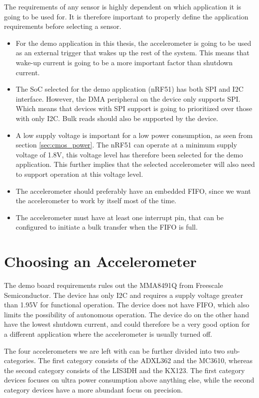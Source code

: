 The requirements of any sensor is highly dependent on which application it is going to be used for. It is therefore important to properly define the application requirements before selecting a sensor.

\begin{itemize}
\item For the demo application in this thesis, the accelerometer is going to be used as an external trigger that wakes up the rest of the system. This means that wake-up current is going to be a more important factor than shutdown current.
\item The SoC selected for the demo application (nRF51) has both SPI and I2C interface. However, the DMA peripheral on the device only supports SPI. Which means that devices with SPI support is going to prioritized over those with only I2C. Bulk reads should also be supported by the device. 
\item A low supply voltage is important for a low power consumption, as seen from section \ref{sec:cmos_power}. The nRF51 can operate at a minimum supply voltage of 1.8V, this voltage level has therefore been selected for the demo application. This further implies that the selected accelerometer will also need to support operation at this voltage level.
\item The accelerometer should preferably have an embedded FIFO, since we want the accelerometer to work by itself most of the time.
\item The accelerometer must have at least one interrupt pin, that can be configured to initiate a bulk transfer when the FIFO is full. 
\end{itemize}

\section{Choosing an Accelerometer}

The demo board requirements rules out the MMA8491Q from Freescale Semiconductor. The device has only I2C and requires a supply voltage greater than 1.95V for functional operation. The device does not have FIFO, which also limits the possibility of autonomous operation. The device do on the other hand have the lowest shutdown current, and could therefore be a very good option for a different application where the accelerometer is usually turned off. 

The four accelerometers we are left with can be further divided into two sub-categories. The first category consists of the ADXL362 and the MC3610, whereas the second category consists of the LIS3DH and the KX123. The first category devices focuses on ultra power consumption above anything else, while the second category devices have a more abundant focus on precision. 

